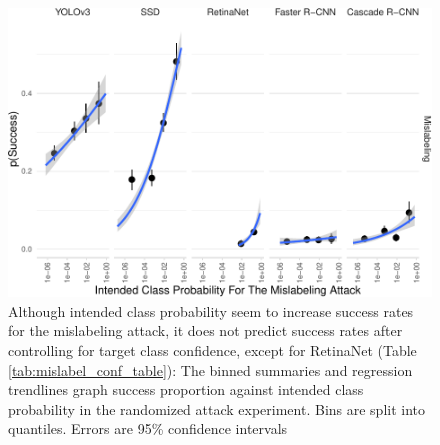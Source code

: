 \begin{figure}[tb]

{\centering \includegraphics{imgs/mislabel_conf_graph-1} 

}

\caption{Although intended class probability seem to increase success rates for the mislabeling attack, it does not predict success rates after controlling for target class confidence, except for RetinaNet (Table \ref{tab:mislabel_conf_table}):  The binned summaries and regression trendlines graph success proportion against intended class probability in the randomized attack experiment. Bins are split into quantiles. Errors are 95\% confidence intervals}\label{fig:mislabel_conf_graph}
\end{figure}

\begingroup\fontsize{9}{11}\selectfont

